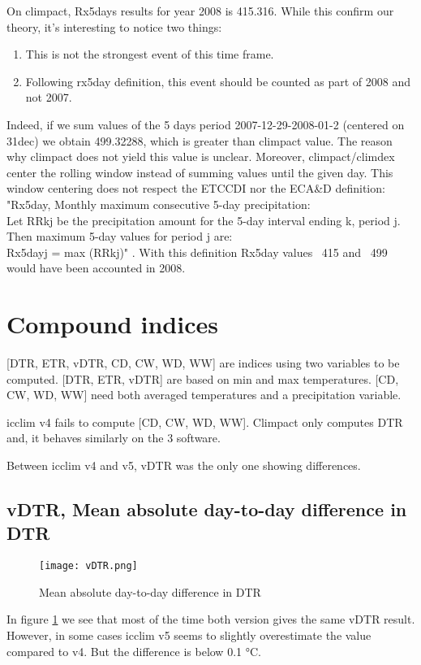 \documentclass[a4paper,11pt]{article}
\begin{document}
        On climpact, Rx5days results for year 2008 is 415.316. While this confirm our theory, it's interesting to notice two things:
        \begin{enumerate}
            \item This is not the strongest event of this time frame.
            \item Following rx5day definition, this event should be counted as part of 2008 and not 2007.
        \end{enumerate}
        Indeed, if we sum values of the 5 days period 2007-12-29-2008-01-2 (centered on 31dec) we obtain 499.32288, which is greater than climpact value.
        The reason why climpact does not yield this value is unclear.
        Moreover, climpact/climdex center the rolling window instead of summing values until the given day. 
        This window centering does not respect the ETCCDI nor the ECA\&D definition:
        "Rx5day, Monthly maximum consecutive 5-day precipitation:\\
        Let RRkj be the precipitation amount for the 5-day interval ending k, period j. Then maximum 5-day values for period j are:\\
        Rx5dayj = max (RRkj)" \cite{doc/etccdi}.
        With this definition Rx5day values ~415 and ~499 would have been accounted in 2008.

    \section{Compound indices}
        [DTR, ETR, vDTR, CD, CW, WD, WW] are indices using two variables to be computed.
        [DTR, ETR, vDTR] are based on min and max temperatures.
        [CD, CW, WD, WW] need both averaged temperatures and a precipitation variable.
        
        icclim v4 fails to compute [CD, CW, WD, WW].
        Climpact only computes DTR and, it behaves similarly on the 3 software. 

        Between icclim v4 and v5, vDTR was the only one showing differences.

        \subsection{vDTR, Mean absolute day-to-day difference in DTR}
            \begin{figure}[!hbt]
                \centering
                \texttt{[image: vDTR.png]}
                \caption{Mean absolute day-to-day difference in DTR}
                \label{figure/vdtr}
            \end{figure}
            In figure \ref{figure/vdtr} we see that most of the time both version gives the same vDTR result.
            However, in some cases icclim v5 seems to slightly overestimate the value compared to v4. But the difference is below 0.1 °C.
\end{document}
